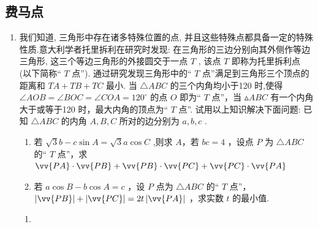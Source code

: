 \subsection*{费马点}
\begin{enumerate}
    \item 我们知道, 三角形中存在诸多特殊位置的点, 并且这些特殊点都具备一定的特殊性质.意大利学者托里拆利在研究时发现: 在三角形的三边分别向其外侧作等边三角形, 这三个等边三角形的外接圆交于一点 $T$ , 该点 $T$ 即称为托里拆利点 (以下简称“ $T$ 点”). 通过研究发现三角形中的“ $T$ 点”满足到三角形三个顶点的距离和 ${TA} + {TB} + {TC}$ 最小. 当 $\bigtriangleup  {ABC}$ 的三个内角均小于120 \textdegree 时,使得 $\angle {AOB} = \angle {BOC} = \angle {COA} = {120}^{ \circ  }$ 的点 $O$ 即为“ $T$ 点”，当 $\vartriangle  {ABC}$ 有一个内角大于或等于120 \textdegree 时，最大内角的顶点为“ $T$ 点”. 试用以上知识解决下面问题: 已知 $\bigtriangleup  {ABC}$ 的内角 $A,B,C$ 所对的边分别为 $a,b,c$ .
    \begin{enumerate}
        \item 若 $\sqrt{3}b - c\sin A = \sqrt{3}a\cos C$ ,则求 $A$，若 ${bc} = 4$ ，设点 $P$ 为 $\bigtriangleup  {ABC}$ 的“ $T$ 点”，求 $\vv{PA} \cdot  \vv{PB} + \vv{PB} \cdot  \vv{PC} + \vv{PC} \cdot  \vv{PA}$
        \item 若 $a\cos B - b\cos A = c$ ，设 $P$ 点为 $\bigtriangleup  {ABC}$ 的“ $T$ 点”， $\left| \vv{PB}\right|  + \left| \vv{PC}\right|  = {2t}\left| \vv{PA}\right|$ ，求实数 $t$ 的最小值.
    \end{enumerate}
    \begin{jieda}
        \begin{enumerate}
            \item {}
\end{enumerate}
\end{jieda}
\end{enumerate}
